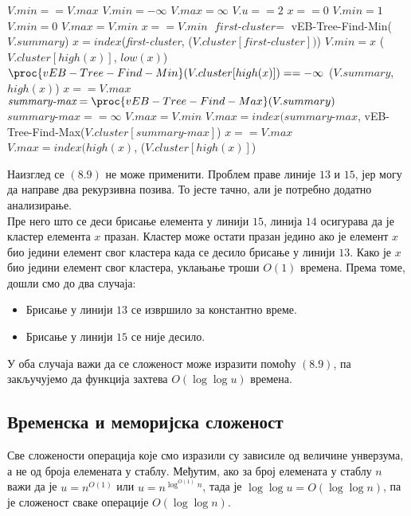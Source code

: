\documentclass[11pt, a4paper]{article}
\theoremstyle{remark}
\numberwithin{equation}{section}
\begin{document}
	\begin{codebox}
		\li \If $V.min==V.max$
		\li \Do $V.min=-\infty$
		\li $V.max=\infty$
		\End
		\li \ElseIf $V.u==2$
		\li \Do \If $x==0$
		\Do \Do \li $V.min=1$
		\li \Else $V.min=0$
		\li $V.max=V.min$
		\End \End
		\li \ElseIf $x==V.min$
		\li \Do $\textit{first-cluster}=$\proc
		{vEB-Tree-Find-Min}($V.summary$)
		\li \Do $x=index$(\textit{first-cluster}, ($V.cluster[\textit{first-cluster}])$)
		\li $V.min=x$
		\li {}($V.cluster[high(x)]$, $low(x)$)
		\li \If $\proc{vEB-Tree-Find-Min}(V.cluster[high(x)])==-\infty$
		\li \Do {}($V.summary$, $high(x)$)
		\li \Do \If $x==V.max$
		\li \Do $\textit{summary-max}=\proc{vEB-Tree-Find-Max}(V.summary)$
		\li \If $\textit{summary-max}==\infty$
		\li \Do $V.max=V.min$
		\End
		\li \Else $V.max=index(\textit{summary-max}$, \proc
		{vEB-Tree-Find-Max}($V.cluster[\textit{summary-max}]$)
		\End \End
		\li \ElseIf $x==V.max$
		\li \Do $V.max=index(high(x)$, ($V.cluster[high(x)]$)
	\end{codebox}

	Наизглед се $(8.9)$ не може применити. Проблем праве линије $13$ и $15$, јер могу да направе два рекурзивна позива. То јесте тачно, али је потребно додатно анализирање. \\
	\indent Пре него што се деси брисање елемента у линији $15$, линија $14$ осигурава да је кластер елемента $x$ празан. Кластер може остати празан једино ако је елемент $x$ био једини елемент свог кластера када се десило брисање у линији $13$. Како је $x$ био једини елемент свог кластера, уклањање троши $O(1)$ времена. Према томе, дошли смо до два случаја:
	\begin{itemize}
		\item Брисање у линији $13$ се извршило за константно време.
		\item Брисање у линији $15$ се није десило.
	\end{itemize}
	
	\indent У оба случаја важи да се сложеност може изразити помоћу $(8.9)$, па закључујемо да функција  захтева $O(\log\log u)$ времена.
	
	\subsection{Временска и меморијска сложеност}
	Све сложености операција које смо изразили су зависиле од величине унверзума, а не од броја елемената у стаблу. Међутим, ако за број елемената у стаблу $n$ важи да је $u=n^{O(1)}$ или $u=n^{\log ^{O(1)}n}$, тада је $\log\log u=O(\log\log n)$, па је сложеност сваке операције $O(\log\log n)$. \\
	
\end{document}
